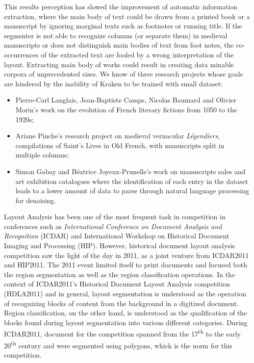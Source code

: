 \documentclass{jdmdh}
\begin{document}
This results perception has slowed the improvement of automatic information extraction, where the main body of text could be drawn from a printed book or a manuscript by ignoring marginal texts such as footnotes or running title. If the segmenter is not able to recognize columns (or separate them) in medieval manuscripts or does not distinguish main bodies of text from foot notes, the co-occurrences of the extracted text are fooled by a wrong interpretation of the layout. Extracting main body of works could result in creating data minable corpora of unprecedented sizes. We know of three research projects whose goals are hindered by the inability of Kraken to be trained with small dataset:

\begin{itemize}
    \item Pierre-Carl Langlais, Jean-Baptiste Camps, Nicolas Baumard and Olivier Morin's work on the evolution of French literary fictions from 1050 to the 1920s;
    \item Ariane Pinche's research project on medieval vernacular \textit{Légendiers}, compilations of Saint's Lives in Old French, with manuscripts split in multiple columns;
    \item Simon Gabay and Béatrice Joyeux-Prunelle's work on manuscripts sales and art exhibition catalogues where the identification of each entry in the dataset leads to a lower amount of data to parse through natural language processing for denoising.
\end{itemize}

Layout Analysis has been one of the most frequent task in competition in conferences such as \textit{International Conference on Document Analysis and Recognition} (ICDAR) and International Workshop on Historical Document Imaging and Processing (HIP). However, historical document layout analysis competition saw the light of the day in 2011, as a joint venture from ICDAR2011 and HIP2011. The 2011 event limited itself to print documents and focused both the region segmentation as well as the region classification operations. In the context of ICDAR2011's Historical Document Layout Analysis competition (HDLA2011) and in general, layout segmentation is understood as the operation of recognizing blocks of content from the background in a digitized document. Region classification, on the other hand, is understood as the qualification of the blocks found during layout segmentation into various different categories. During ICDAR2011, document for the competition spanned from the 17\textsuperscript{th} to the early 20\textsuperscript{th} century and were segmented using polygons, which is the norm for this competition.
\end{document}

